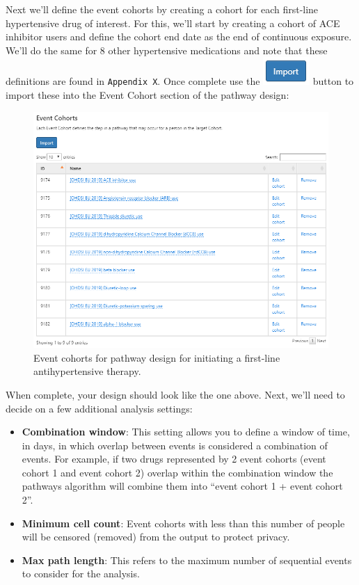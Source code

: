 \documentclass[11pt]{book}
\providecommand{\tightlist}{%
  \setlength{\itemsep}{0pt}\setlength{\parskip}{0pt}}
\theoremstyle{definition}
\theoremstyle{definition}
\theoremstyle{definition}
\theoremstyle{remark}
\begin{document}
Next we'll define the event cohorts by creating a cohort for each first-line hypertensive drug of interest. For this, we'll start by creating a cohort of ACE inhibitor users and define the cohort end date as the end of continuous exposure. We'll do the same for 8 other hypertensive medications and note that these definitions are found in \texttt{Appendix\ X}. Once complete use the \includegraphics{images/Characterization/atlasImportButton.png} button to import these into the Event Cohort section of the pathway design:

\begin{figure}

{\centering \includegraphics[width=1\linewidth]{images/Characterization/atlasPathwaysEventCohorts} 

}

\caption{Event cohorts for pathway design for initiating a first-line antihypertensive therapy.}\label{fig:atlasPathwaysEventCohorts}
\end{figure}

When complete, your design should look like the one above. Next, we'll need to decide on a few additional analysis settings:

\begin{itemize}
\tightlist
\item
  \textbf{Combination window}: This setting allows you to define a window of time, in days, in which overlap between events is considered a combination of events. For example, if two drugs represented by 2 event cohorts (event cohort 1 and event cohort 2) overlap within the combination window the pathways algorithm will combine them into ``event cohort 1 + event cohort 2''.
\item
  \textbf{Minimum cell count}: Event cohorts with less than this number of people will be censored (removed) from the output to protect privacy.
\item
  \textbf{Max path length}: This refers to the maximum number of sequential events to consider for the analysis.
\end{itemize}
\end{document}

